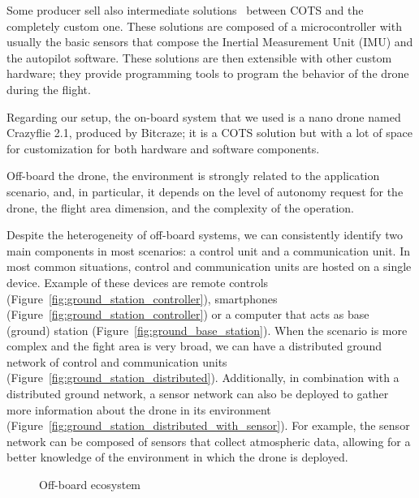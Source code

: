 Some producer sell also intermediate solutions~\cite{pixhawk, px4, cube, navio2} between COTS and the completely custom one.
These solutions are composed of a microcontroller with usually the basic sensors that compose the 
Inertial Measurement Unit (IMU) and the autopilot software. 
These solutions are then extensible with other custom hardware; they provide programming tools to program the 
behavior of the drone during the flight.

Regarding our setup, the on-board system that we used is a nano drone named Crazyflie 2.1, produced by Bitcraze; 
it is a COTS solution but with a lot of space for customization for both hardware and software components.

Off-board the drone, the environment is strongly related to the application scenario, and, in particular, it depends on the level of 
autonomy request for the drone, the flight area dimension, and the complexity of the operation.

Despite the heterogeneity of off-board systems, we can consistently identify two main components in most scenarios: a control unit and a communication unit. 
In most common situations, control and communication units are hosted on a single device.
Example of these devices are remote controls (Figure~\ref{fig:ground_station_controller}), smartphones (Figure~\ref{fig:ground_station_controller})
or a computer that acts as base (ground) station (Figure~\ref{fig:ground_base_station}).
When the scenario is more complex and the fight area is very broad, 
we can have a distributed ground network of control and communication units (Figure~\ref{fig:ground_station_distributed}).
Additionally, in combination with a distributed ground network, a sensor network can also be deployed to gather more information about the drone in its environment (Figure~\ref{fig:ground_station_distributed_with_sensor}). 
For example, the sensor network can be composed of sensors that collect atmospheric data, allowing for a better knowledge of the environment in which the drone is deployed. 

\begin{figure}[tb]
    \centering
    \quad
    \quad
    \quad
    \quad
    \caption[Off-board ecosystem]{Off-board ecosystem}\label{fig:off_board_ecosystem}
\end{figure}

